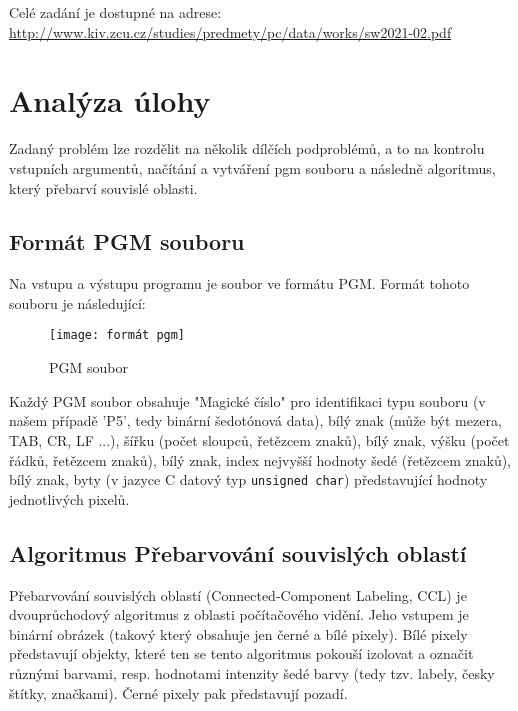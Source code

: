 \documentclass[12pt, a4paper]{article}
\begin{document}
\vspace{0.5cm}
\noindent Celé zadání je dostupné na adrese: \url{http://www.kiv.zcu.cz/studies/predmety/pc/data/works/sw2021-02.pdf}


\section{Analýza úlohy}
Zadaný problém lze rozdělit na několik dílčích podproblémů, a to na kontrolu vstupních argumentů, načítání a vytváření pgm souboru a následně algoritmus, který přebarví souvislé oblasti.
\subsection{Formát PGM souboru}
\label{s:2}
Na vstupu a výstupu programu je soubor ve formátu PGM. Formát tohoto souboru je následující:

\begin{wrapfigure}{l}{0.4\textwidth}
    \texttt{[image: formát pgm]}
    \caption{PGM soubor}
\end{wrapfigure}
Každý PGM soubor obsahuje "Magické číslo" pro identifikaci typu souboru (v našem případě 'P5', tedy binární šedotónová data), bílý znak (může být mezera, TAB, CR, LF ...), šířku (počet sloupců, řetězcem znaků), bílý znak, výšku (počet řádků, řetězcem znaků), bílý znak, index nejvyšší hodnoty šedé (řetězcem znaků), bílý znak, byty (v jazyce C datový typ \texttt{unsigned char}) představující hodnoty jednotlivých pixelů.

\subsection{Algoritmus Přebarvování souvislých oblastí} \label{algoritmus}
Přebarvování souvislých oblastí (Connected-Component Labeling, CCL) je dvouprůchodový algoritmus z oblasti počítačového vidění. Jeho vstupem je binární obrázek (takový který obsahuje jen černé a bílé pixely). Bílé pixely představují objekty, které ten se tento algoritmus pokouší izolovat a označit různými barvami, resp. hodnotami intenzity šedé barvy (tedy tzv. labely, česky štítky, značkami). Černé pixely pak představují pozadí.
\end{document}
